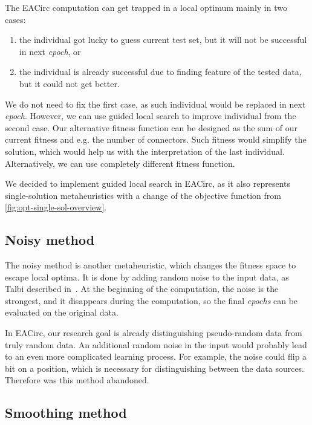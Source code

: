 \documentclass[
  print, %
  Table,   %
  nolof,     %
  nolot,     %
  11pt, %
  oneside  %
]{fithesis3}
\begin{document}
The EACirc computation can get trapped in a local optimum mainly in two cases:

\begin{enumerate}[noitemsep,topsep=3pt,parsep=3pt,partopsep=3pt]
    \item the individual got lucky to guess current test set, but it will not be successful in next \textit{epoch}, or
    \item the individual is already successful due to finding feature of the tested data, but it could not get better.
\end{enumerate}

We do not need to fix the first case, as such individual would be replaced in next \textit{epoch}. However, we can use guided local search to improve individual from the second case. Our alternative fitness function can be designed as the sum of our current fitness and e.g. the number of connectors. Such fitness would simplify the solution, which would help us with the interpretation of the last individual. Alternatively, we can use completely different fitness function.

We decided to implement guided local search in EACirc, as it also represents single-solution metaheuristics with a change of the objective function from \cref{fig:opt-single-sol-overview}.

\subsection{Noisy method}
\label{subsec:opt-single-sol-nois}

The noisy method is another metaheuristic, which changes the fitness space to escape local optima. It is done by adding random noise to the input data, as Talbi described in~\cite[Section 2.9.2]{talbi2009metaheuristics}. At the beginning of the computation, the noise is the strongest, and it disappears during the computation, so the final \textit{epochs} can be evaluated on the original data.

In EACirc, our research goal is already distinguishing pseudo-random data from truly random data. An additional random noise in the input would probably lead to an even more complicated learning process. For example, the noise could flip a bit on a position, which is necessary for distinguishing between the data sources. Therefore was this method abandoned.

\subsection{Smoothing method}
\label{subsec:opt-single-sol-smooth}
\end{document}

